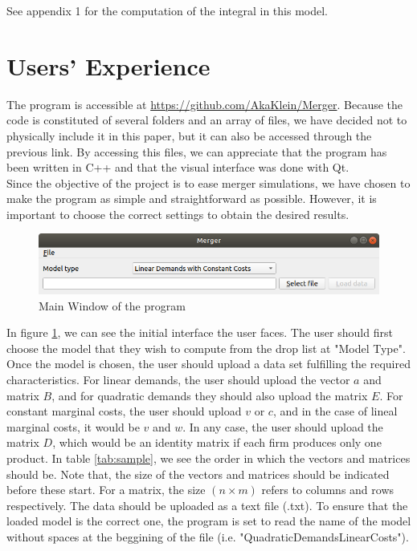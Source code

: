 \documentclass[12pt]{article}
\begin{document}
See appendix 1 for the computation of the integral in this model.  

\section{Users' Experience}

The program is accessible at  \url{https://github.com/AkaKlein/Merger}. Because the code is constituted of several folders and an array of files, we have decided not to physically include it in this paper, but it can also be accessed through the previous link. By accessing this files, we can appreciate that the program has been written in C++ and that the visual interface was done with Qt.\\
Since the objective of the project is to ease merger simulations, we have chosen to make the program as simple and straightforward as possible.  However, it is important to choose the correct settings to obtain the desired results.
\begin{figure}[H]
\begin{center}
  \includegraphics[width=10 cm]{home}
\caption{\label{home}Main Window of the program}
\end{center}
\end{figure}

In figure \ref{home}, we can see the initial interface the user faces. The user should first choose the model that they wish to compute from the drop list at "Model Type". Once the model is chosen, the user should upload a data set fulfilling the required characteristics. For linear demands, the user should upload the vector $a$ and matrix $B$, and for quadratic demands they should also upload the matrix $E$. For constant marginal costs, the user should upload $v$ or $c$, and in the case of lineal marginal costs, it would be $v$ and $w$. In any case, the user should upload the matrix $D$, which would be an identity matrix if each firm produces only one product. In table \ref{tab:sample}, we see the order in which the vectors and matrices should be. Note that, the size of the vectors and matrices should be indicated before these start. For a matrix, the size $(n \times m)$ refers to columns and rows respectively. The data should be uploaded as a text file (.txt). To ensure that the loaded model is the correct one, the program is set to read the name of the model without spaces at the beggining of the file (i.e. "QuadraticDemandsLinearCosts").
\end{document}
